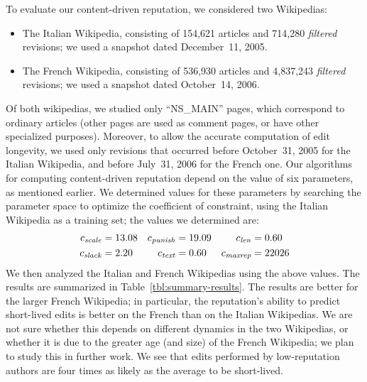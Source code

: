 To evaluate our content-driven reputation, we considered two Wikipedias: 
%
\begin{itemize}

\item The Italian Wikipedia, consisting of 154,621 articles and 714,280
  {\em filtered\/} revisions; we used a snapshot dated December~11, 2005. 
\item The French Wikipedia, consisting of 536,930 articles and
  4,837,243 {\em filtered\/} revisions; we used a snapshot dated
  October~14, 2006. 

\end{itemize}
%
Of both wikipedias, we studied only ``NS\_MAIN'' pages, which
correspond to ordinary articles (other pages are used as comment
pages, or have other specialized purposes). 
Moreover, to allow the accurate computation of edit
longevity, we used only revisions that occurred before October~31, 2005 for
the Italian Wikipedia, and before July~31, 2006 for the French one. 
Our algorithms for computing content-driven reputation depend on the
value of six parameters, as mentioned earlier. 
We determined values for these parameters by searching the parameter
space to optimize the coefficient of constraint, using the Italian
Wikipedia as a training set; the values we determined are: 
%
\begin{align*}
   {c_{{\text{\textit{scale}}}}}      & = 13.08
  & {c_{{\text{\textit{punish}}}}}   & = 19.09
  & {c_{{\text{\textit{len}}}}}     & = 0.60   \\
   {c_{{\text{\textit{slack}}}}}         & = 2.20
  & {c_{{\text{\textit{text}}}}}     & = 0.60
  & {c_{{\text{\textit{maxrep}}}}}   & = 22026
\end{align*}
%
We then analyzed the Italian and French Wikipedias using the above
values. 
The results are summarized in Table~\ref{tbl:summary-results}. 
The results are better for the larger French Wikipedia; in particular,
the reputation's ability to predict short-lived edits is better on the
French than on the Italian Wikipedias. 
We are not sure whether this depends on different dynamics in the two
Wikipedias, or whether it is due to the greater age (and size) of the
French Wikipedia; we plan to study this in further work. 
We see that edits performed by low-reputation authors are four times
as likely as the average to be short-lived. 

